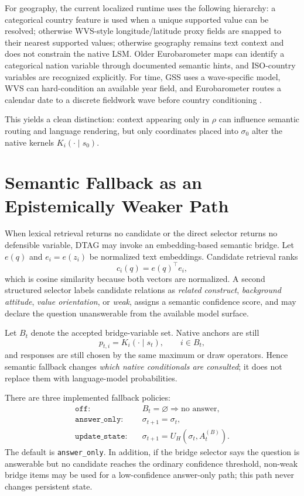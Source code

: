 \documentclass[journal]{IEEEtran}
\newcommand{\1}{\mathbf{1}}
\begin{document}
For geography, the current localized runtime uses the following hierarchy: a categorical country feature is used when a unique supported value can be resolved; otherwise WVS-style longitude/latitude proxy fields are snapped to their nearest supported values; otherwise geography remains text context and does not constrain the native LSM. Older Eurobarometer maps can identify a categorical nation variable through documented semantic hints, and ISO-country variables are recognized explicitly. For time, GSS uses a wave-specific model, WVS can hard-condition an available year field, and Eurobarometer routes a calendar date to a discrete fieldwork wave before country conditioning \cite{dtag2026}.

This yields a clean distinction: context appearing only in $\rho$ can influence semantic routing and language rendering, but only coordinates placed into $\sigma_0$ alter the native kernels $K_i(\cdot\mid s_0)$.

\section{Semantic Fallback as an Epistemically Weaker Path}
\label{sec:fallback}

When lexical retrieval returns no candidate or the direct selector returns no defensible variable, DTAG may invoke an embedding-based semantic bridge. Let $e(q)$ and $e_i=e(z_i)$ be normalized text embeddings. Candidate retrieval ranks
\begin{equation}
  c_i(q)=e(q)^\top e_i,
  \label{eq:cosine}
\end{equation}
which is cosine similarity because both vectors are normalized. A second structured selector labels candidate relations as \emph{related construct}, \emph{background attitude}, \emph{value orientation}, or \emph{weak}, assigns a semantic confidence score, and may declare the question unanswerable from the available model surface.

Let $B_t$ denote the accepted bridge-variable set. Native anchors are still
\begin{equation}
  p_{t,i}=K_i(\cdot\mid s_t), \qquad i\in B_t,
\end{equation}
and responses are still chosen by the same maximum or draw operators. Hence semantic fallback changes \emph{which native conditionals are consulted}; it does not replace them with language-model probabilities.

There are three implemented fallback policies:
\begin{align}
  \texttt{off}:&\quad B_t=\varnothing\Rightarrow\text{no answer},\\
  \texttt{answer\_only}:&\quad \sigma_{t+1}=\sigma_t,\\
  \texttt{update\_state}:&\quad \sigma_{t+1}=U_H(\sigma_t,A_t^{(B)}).
  \label{eq:fallbackmodes}
\end{align}
The default is \texttt{answer\_only}. In addition, if the bridge selector says the question is answerable but no candidate reaches the ordinary confidence threshold, non-weak bridge items may be used for a low-confidence answer-only path; this path never changes persistent state.
\end{document}
